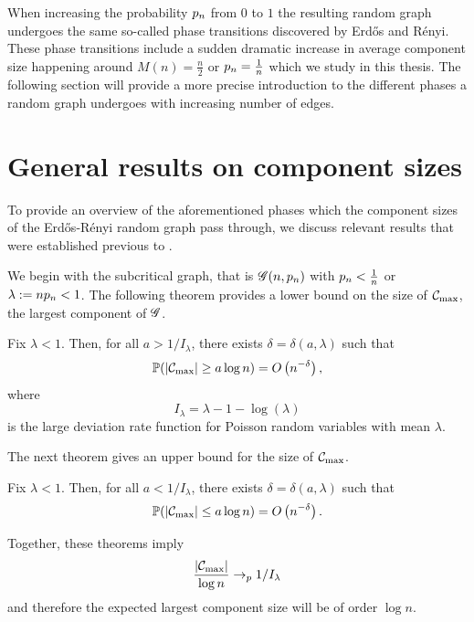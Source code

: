 When increasing the probability $p_n$ from $0$ to $1$ the resulting random graph undergoes the same so-called phase transitions
discovered by Erd\H{o}s and Rényi.
These phase transitions include a sudden dramatic increase in average component size happening around $M(n) = \frac{n}{2}$ or $p_n = \frac{1}{n}$
which we study in this thesis.
The following section will provide a more precise introduction to the different phases a random graph undergoes
with increasing number of edges.


\section{General results on component sizes}

To provide an overview of the aforementioned phases
which the component sizes of the Erd\H{o}s-Rényi random graph pass through,
we discuss relevant results that were established previous to \cite{Aldous.1997}.

We begin with the subcritical graph, that is
$\mathscr{G}(n, p_n)$ with $p_n < \frac{1}{n}$
or $\lambda := n p_n < 1$.
The following theorem provides a lower bound on the size of $\mathcal{C}_{\max}$, the largest component of $\mathscr{G}$.
\begin{theorem}
	Fix $\lambda < 1$. 
	Then, for all $a > 1/I_{\lambda}$, 
	there exists $\delta = \delta(a, \lambda)$ such that
	\begin{equation*}
		\mathbb{P}( |\mathcal{C}_{\max}| \geq a \log n ) = O\left(n^{-\delta}\right),
	\end{equation*}
	where 
	\begin{equation*}
		I_{\lambda} = \lambda - 1 - \log(\lambda)
	\end{equation*}
	is the large deviation rate function for Poisson random variables with mean $\lambda$.
\end{theorem}
The next theorem gives an upper bound for the size of $\mathcal{C}_{\max}$.
\begin{theorem}
	Fix $\lambda < 1$. 
	Then, for all $a < 1/I_{\lambda}$, 
	there exists $\delta = \delta(a, \lambda)$ such that
	\begin{equation*}
	\mathbb{P}( |\mathcal{C}_{\max}| \leq a \log n ) = O\left(n^{-\delta}\right).
	\end{equation*}
\end{theorem}
Together, these theorems imply
\begin{equation*} \label{I: conv prob}
	\frac{|\mathcal{C}_{\max}|}{\log n} \rightarrow_p 1/I_{\lambda}
\end{equation*}
and therefore the expected largest component size will be of order $\log n$.

